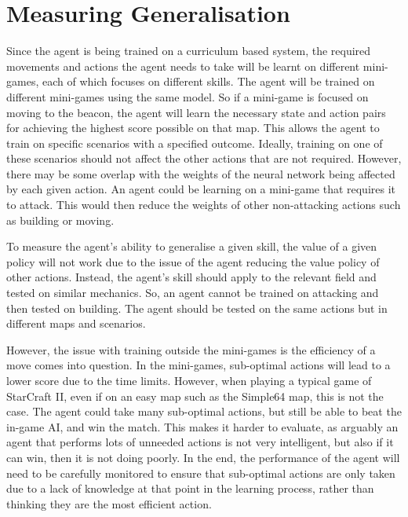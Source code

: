 \section{Measuring Generalisation}

Since the agent is being trained on a curriculum based system, the required
movements and actions the agent needs to take will be learnt on different
mini-games, each of which focuses on different skills. The agent will be trained
on different mini-games using the same model. So if a mini-game is focused on
moving to the beacon, the agent will learn the necessary state and action pairs
for achieving the highest score possible on that map. This allows the agent to
train on specific scenarios with a specified outcome. Ideally, training on one
of these scenarios should not affect the other actions that are not required.
However, there may be some overlap with the weights of the neural network being affected
by each given action. An agent could be learning on a mini-game that requires
it to attack. This would then reduce the weights of other non-attacking actions
such as building or moving.

To measure the agent's ability to generalise a given skill, the value of
a given policy will not work due to the issue of the agent reducing the value
policy of other actions. Instead, the agent's skill should apply to the
relevant field and tested on similar mechanics. So, an agent cannot be trained
on attacking and then tested on building. The agent should be tested on the same
actions but in different maps and scenarios.

However, the issue with training outside the mini-games is the
efficiency of a move comes into question. In the mini-games, sub-optimal actions
will lead to a lower score due to the time limits. However, when playing a
typical game of StarCraft II, even if on an easy map such as the Simple64 map,
this is not the case. The agent could take many sub-optimal actions, but still
be able to beat the in-game AI, and win the match. This makes it harder to
evaluate, as arguably an agent that performs lots of unneeded actions is not very
intelligent, but also if it can win, then it is not doing poorly. In the
end, the performance of the agent will need to be carefully monitored to ensure
that sub-optimal actions are only taken due to a lack of knowledge at that point
in the learning process, rather than thinking they are the most efficient
action.
